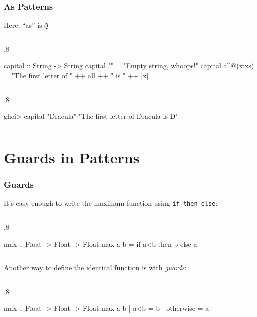 \documentclass{beamer}
\newenvironment{codeblock}[1][.8]{%
\begin{columns}
\begin{column}{#1\linewidth}
\begin{exampleblock}{}}{%
\end{exampleblock}
\end{column}
\end{columns}}
\begin{document}
\begin{frame}[fragile]
\frametitle{As Patterns}

Here, ``as'' is \verb+@+
\begin{codeblock}
\begin{hcode}
capital :: String -> String  
capital "" = "Empty string, whoops!"  
capital all@(x:xs) = "The first letter of " ++ all ++ " is " ++ [x] 
\end{hcode}
\end{codeblock}

\begin{codeblock}
\begin{hcode}
ghci> capital "Dracula"  
"The first letter of Dracula is D" 
\end{hcode}
\end{codeblock}

\end{frame}


\section{Guards in Patterns}

\begin{frame}[fragile]
\frametitle{Guards}

It's easy enough to write the maximum function using 
\verb+if-then-else+:
\begin{codeblock}
\begin{hcode}
max :: Float -> Float -> Float
max a b = if a<b then b else a
\end{hcode}
\end{codeblock}
\vfill

\pause
Another way to define the identical function is with \emph{guards}:
\begin{codeblock}
\begin{hcode}
max :: Float -> Float -> Float
max a b | a<b       = b
        | otherwise = a
\end{hcode}
\end{codeblock}


\end{frame}
\end{document}
